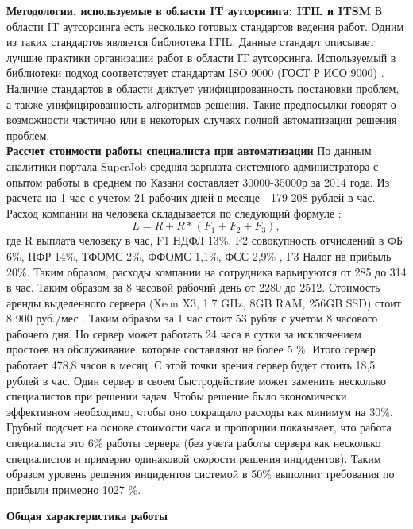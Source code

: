 \textbf{Методологии, используемые в области IT аутсорсинга: ITIL и ITSM} 
В области IT аутсорсинга есть несколько готовых стандартов ведения работ. Одним из таких стандартов является библиотека ITIL. Данные стандарт описывает лучшие практики организации работ в области IT аутсорсинга. Используемый в библиотеки подход соответствует стандартам ISO 9000 (ГОСТ Р ИСО 9000) .
Наличие стандартов в области диктует унифицированность постановки проблем, а также унифицированность алгоритмов решения. Такие предпосылки говорят о возможности частично или в некоторых случаях полной автоматизации решения проблем. \\
\textbf{Рассчет стоимости работы специалиста при автоматизации} 
По данным аналитики портала SuperJob \cite{SuperJob} средняя зарплата системного администратора с опытом работы в среднем по Казани составляет 30000-35000р за 2014 года. Из расчета на 1 час с учетом 21 рабочих дней в месяце - 179-208 рублей в час. Расход компании на человека складывается по следующий формуле \cite{FiscalCodecs} :
\[
L = R + R*(F_1 +F_2+F_3),
\]
где R выплата человеку в час, F1 НДФЛ 13\%, F2 совокупность отчислений в ФБ 6\%, ПФР 14\%, ТФОМС 2\%, ФФОМС 1,1\%, ФСС 2,9\% , F3 Налог на прибыль 20\%. 
Таким образом, расходы компании на сотрудника варьируются от 285 до 314 в час. Таким образом за 8 часовой рабочий день от 2280 до 2512. Стоимость аренды выделенного сервера (Xeon X3, 1.7 GHz, 8GB RAM, 256GB SSD) стоит 8 900 руб./мес \cite{TimeWeb}. Таким образом за 1 час стоит 53 рубля с учетом 8 часового рабочего дня. Но сервер может работать 24 часа в сутки за исключением простоев на обслуживание, которые составляют не более 5 \%. Итого сервер работает 478,8 часов в месяц. С этой точки зрения сервер будет стоить 18,5 рублей в час. Один сервер в своем быстродействие может заменить несколько специалистов при решении задач. Чтобы решение было экономически эффективном необходимо, чтобы оно сокращало расходы как минимум на 30\%. Грубый подсчет на основе стоимости часа и пропорции показывает, что работа специалиста это 6\% работы сервера (без учета работы сервера как несколько специалистов и примерно одинаковой скорости решения инцидентов). Таким образом уровень решения инцидентов системой в 50\% выполнит требования по прибыли примерно 1027 \%. 


\textbf{Общая характеристика работы} 

